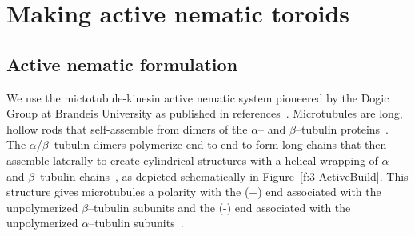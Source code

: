 \section{Making active nematic toroids}
\subsection{Active nematic formulation}
We use the mictotubule-kinesin active nematic system pioneered by the Dogic Group at Brandeis University as published in references~\cite{RN3,RN27,RN9,RN135,RN134}.
Microtubules are long, hollow rods that self-assemble from dimers of the $\alpha$-- and $\beta$--tubulin proteins~\cite{RN248}.
The $\alpha$/$\beta$--tubulin dimers polymerize end-to-end to form long chains that then assemble laterally to create cylindrical structures with a helical wrapping of $\alpha$-- and $\beta$--tubulin chains~\cite{RN248,RN249}, as depicted schematically in Figure~\ref{f:3-ActiveBuild}.
This structure gives microtubules a polarity with the (+) end associated with the unpolymerized $\beta$--tubulin subunits and the (-) end associated with the unpolymerized $\alpha$--tubulin subunits~\cite{RN248,RN249}.

